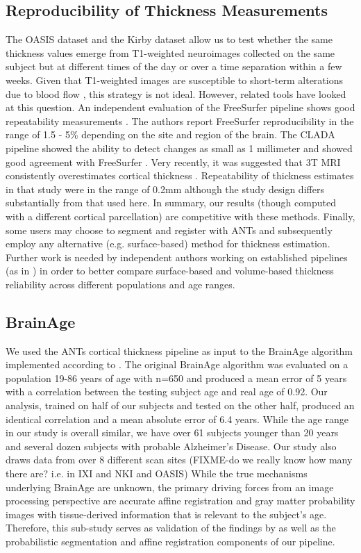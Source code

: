 \subsection{Reproducibility of Thickness Measurements}
The OASIS dataset and the Kirby dataset allow us to test whether the same
thickness values emerge from T1-weighted
neuroimages collected on the same subject but at different times of
the day or over a time separation within a few weeks.  Given that
T1-weighted images are susceptible to short-term alterations due to
blood flow \cite{Franklin2013,Salgado-Pineda2006,Yamasue2007}, this strategy is not ideal.  However, related
tools have looked at this question. An independent evaluation of the FreeSurfer pipeline shows good
repeatability measurements \cite{jovicich2013}. The authors report
FreeSurfer reproducibility in the range of 1.5 - 5\% depending on the
site and region of the brain.  The CLADA pipeline showed the ability to detect
changes as small as 1 millimeter and showed good agreement with
FreeSurfer \cite{nakamura2011}. Very recently, it was suggested that 3T MRI
consistently overestimates cortical thickness \cite{Luesebrink2013}.
Repeatability of thickness estimates in that study were in the range
of 0.2mm although the study design differs substantially from that used here.
In summary, our results (though computed
with a different cortical parcellation) are competitive with these
methods.  Finally, some users may choose to segment and register
with ANTs and subsequently employ any alternative (e.g. surface-based)
method for thickness estimation.  Further work is needed by
independent authors working on established pipelines (as in \cite{Luesebrink2013,jovicich2013}) in order to
better compare surface-based and volume-based thickness reliability
across different populations and age ranges. 

\subsection{BrainAge} 
We used the ANTs cortical thickness pipeline as input to the BrainAge
algorithm implemented according to \cite{franke2010}.  The original
BrainAge algorithm was evaluated on a population 19-86 years of age
with n=650 and produced a mean error of 5 years with a correlation
between the testing subject age and real age of 0.92.  Our analysis,
trained on half of our subjects and tested on the other half, produced
an identical correlation and a mean absolute error of 6.4 years.
While the age range in our study is overall similar, we have over
61 subjects younger than 20 years and several dozen subjects with
probable Alzheimer's Disease.  Our study also draws data from over
8 different scan sites (FIXME-do we really know how many there
are? i.e. in IXI and NKI and OASIS)  While the true mechanisms underlying BrainAge are unknown, the
primary driving forces from an image processing perspective are accurate affine registration and gray
matter probability images with tissue-derived information that is
relevant to the subject's age.  Therefore, this sub-study serves as
validation of the findings by \cite{franke2010} as well as the
probabilistic segmentation and affine registration components of our
pipeline.

